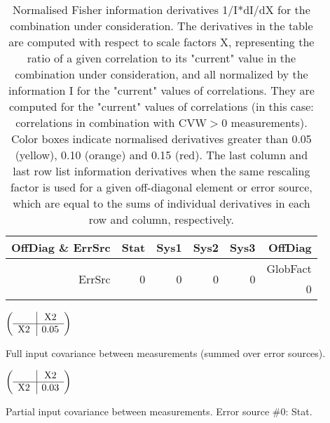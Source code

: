 \begin{table}[H]
\scriptsize
\begin{center}
\renewcommand{\arraystretch}{1.1}
\begin{tabular}{|r|rrrr|r|}
\hline
 OffDiag \& ErrSrc & {\tiny Stat} & {\tiny Sys1} & {\tiny Sys2} & {\tiny Sys3} & OffDiag\\
\hline
\hline
\multirow{2}{*}{ErrSrc} & \multirow{2}{*}{ 0} & \multirow{2}{*}{ 0} & \multirow{2}{*}{ 0} & \multirow{2}{*}{ 0} & GlobFact\\
 & & & & &  0 \\
\hline
\end{tabular}
\renewcommand{\arraystretch}{1}
\caption{Normalised Fisher information derivatives 1/I*dI/dX for the combination under consideration. The derivatives in the table are computed with respect to scale factors X, representing the ratio of a given correlation to its "current" value in the combination under consideration, and all normalized by the information I for the "current" values of correlations. They are computed for the "current" values of correlations (in this case: correlations in combination with CVW$>$0 measurements). Color boxes indicate normalised derivatives greater than 0.05 (yellow), 0.10 (orange) and 0.15 (red). The last column and last row list information derivatives when the same rescaling factor is used for a given off-diagonal element or error source, which are equal to the sums of individual derivatives in each row and column, respectively.}
\end{center}
\end{table}
\begin{table}[H]
\scriptsize
\begin{center}
\renewcommand{\arraystretch}{1.1}
\begin{math}\left(\begin{array}{c|c}
 & \mathrm{X2} \\
\hline
\mathrm{X2} \hspace*{2pt} &       0.05 \\
\end{array}\right)\end{math}
\caption{Full input covariance between measurements (summed over error sources).}
\renewcommand{\arraystretch}{1}
\end{center}
\end{table}
\begin{table}[H]
\scriptsize
\begin{center}
\renewcommand{\arraystretch}{1.1}
\begin{math}\left(\begin{array}{c|c}
 & \mathrm{X2} \\
\hline
\mathrm{X2} \hspace*{2pt} &       0.03 \\
\end{array}\right)\end{math}
\caption{Partial input covariance between measurements. Error source \#0: Stat.}
\renewcommand{\arraystretch}{1}
\end{center}
\end{table}
